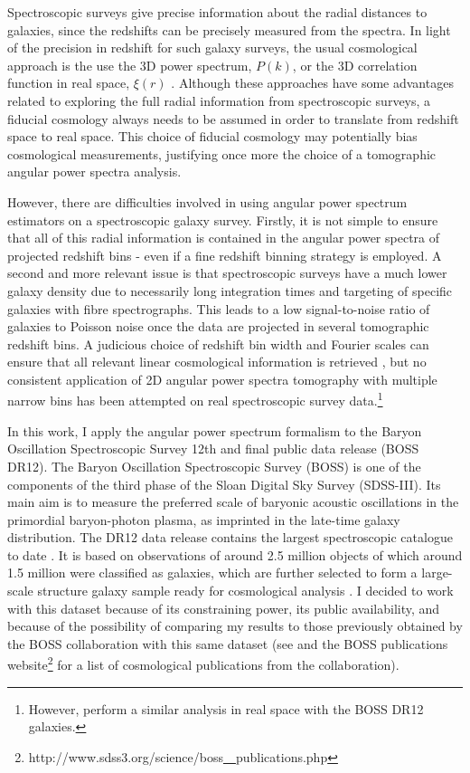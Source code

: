 \qquad Spectroscopic surveys give precise information about the radial distances to galaxies, since the redshifts can be precisely measured from the spectra. In light of the precision in redshift for such galaxy surveys, the usual cosmological approach is the use the 3D power spectrum, $P(k)$, or the 3D correlation function in real space, $\xi(r)$ \citep{2001Percival,2017RossBOSS,2017BeutlerBOSS,2017WangBOSS}. Although these approaches have some advantages related to exploring the full radial information from spectroscopic surveys, a fiducial cosmology always needs to be assumed in order to translate from redshift space to real space. This choice of fiducial cosmology may potentially bias cosmological measurements, justifying once more the choice of a tomographic angular power spectra analysis.

\qquad However, there are difficulties involved in using angular power spectrum estimators on a spectroscopic galaxy survey. Firstly, it is not simple to ensure that all of this radial information is contained in the angular power spectra of projected redshift bins - even if a fine redshift binning strategy is employed. A second and more relevant issue is that spectroscopic surveys have a much lower galaxy density due to necessarily long integration times and targeting of specific galaxies with fibre spectrographs. This leads to a low signal-to-noise ratio of galaxies to Poisson noise once the data are projected in several tomographic redshift bins. A judicious choice of redshift bin width and Fourier scales can ensure that all relevant linear cosmological information is retrieved \citep{Asorey2012, Gaztanaga2012, Eriksen2015, Kirk2015}, but no consistent application of 2D angular power spectra tomography with multiple narrow bins has been attempted on real spectroscopic survey data.\footnote{However, \citet{2017SalazarBOSSwTheta} perform a similar analysis in real space with the BOSS DR12 galaxies.}

\qquad In this work, I apply the angular power spectrum formalism to the Baryon Oscillation Spectroscopic Survey 12th and final public data release (BOSS DR12). The Baryon Oscillation Spectroscopic Survey (BOSS) is one of the components of the third phase of the Sloan Digital Sky Survey (SDSS-III). Its main aim is to measure the preferred scale of baryonic acoustic oscillations in the primordial baryon-photon plasma, as imprinted in the late-time galaxy distribution. The DR12 data release contains the largest spectroscopic catalogue to date \citep{BOSS2015}. It is based on observations of around 2.5 million objects of which around 1.5 million were classified as galaxies, which are further selected to form a large-scale structure galaxy sample ready for cosmological analysis \citep{BOSSCatalogue2016}. I decided to work with this dataset because of its constraining power, its public availability, and because of the possibility of comparing my results to those previously obtained by the BOSS collaboration with this same dataset (see \citealt{2016BOSSCosmology} and the BOSS publications website\footnote{http://www.sdss3.org/science/boss\underline{~~}publications.php} for a list of cosmological publications from the collaboration).

